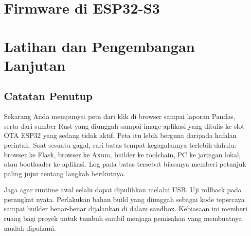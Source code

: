 \documentclass[11pt,letterpaper,openany]{book}
\begin{document}
\part{Firmware di ESP32-S3}




\part{Latihan dan Pengembangan Lanjutan}




\appendix



\backmatter
\chapter*{Catatan Penutup}
Sekarang Anda mempunyai peta dari klik di browser sampai laporan Pandas, serta dari sumber Rust yang diunggah sampai image aplikasi yang ditulis ke slot OTA ESP32 yang sedang tidak aktif. Peta itu lebih berguna daripada hafalan perintah. Saat sesuatu gagal, cari batas tempat kegagalannya terlebih dahulu: browser ke Flask, browser ke Axum, builder ke toolchain, PC ke jaringan lokal, atau bootloader ke aplikasi. Log pada batas tersebut biasanya memberi petunjuk paling jujur tentang langkah berikutnya.

Jaga agar runtime awal selalu dapat dipulihkan melalui USB. Uji rollback pada perangkat nyata. Perlakukan bahan build yang diunggah sebagai kode tepercaya sampai builder benar-benar dijalankan di dalam sandbox. Kebiasaan ini memberi ruang bagi proyek untuk tumbuh sambil menjaga pemisahan yang membuatnya mudah dipahami.
\end{document}
